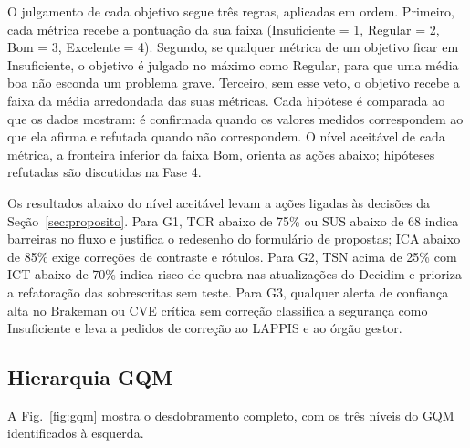 \documentclass[journal]{IEEEtran}
\begin{document}
O julgamento de cada objetivo segue três regras, aplicadas em ordem. Primeiro, cada métrica recebe a pontuação da sua faixa (Insuficiente = 1, Regular = 2, Bom = 3, Excelente = 4). Segundo, se qualquer métrica de um objetivo ficar em Insuficiente, o objetivo é julgado no máximo como Regular, para que uma média boa não esconda um problema grave. Terceiro, sem esse veto, o objetivo recebe a faixa da média arredondada das suas métricas. Cada hipótese é comparada ao que os dados mostram: é confirmada quando os valores medidos correspondem ao que ela afirma e refutada quando não correspondem. O nível aceitável de cada métrica, a fronteira inferior da faixa Bom, orienta as ações abaixo; hipóteses refutadas são discutidas na Fase 4.

Os resultados abaixo do nível aceitável levam a ações ligadas às decisões da Seção~\ref{sec:proposito}. Para G1, TCR abaixo de 75\% ou SUS abaixo de 68 indica barreiras no fluxo e justifica o redesenho do formulário de propostas; ICA abaixo de 85\% exige correções de contraste e rótulos. Para G2, TSN acima de 25\% com ICT abaixo de 70\% indica risco de quebra nas atualizações do Decidim e prioriza a refatoração das sobrescritas sem teste. Para G3, qualquer alerta de confiança alta no Brakeman ou CVE crítica sem correção classifica a segurança como Insuficiente e leva a pedidos de correção ao LAPPIS e ao órgão gestor.

\subsection{Hierarquia GQM}
\label{sec:hierarquia}

A Fig.~\ref{fig:gqm} mostra o desdobramento completo, com os três níveis do GQM identificados à esquerda.
\end{document}
